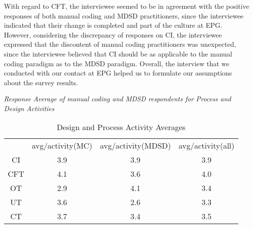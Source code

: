 \documentclass[final_report_innit.tex]{subfiles}
\newcommand\Tstrut{\rule{0pt}{2.6ex}}       %
\begin{document}
With regard to CFT, the interviewee seemed to be in agreement with the positive responses of both manual coding and MDSD practitioners, since the interviewee indicated that their change is completed and part of the culture at EPG. However, considering the discrepancy of responses on CI, the interviewee expressed that the discontent of manual coding practitioners was unexpected, since the interviewee believed that CI should be as applicable to the manual coding paradigm as to the MDSD paradigm. Overall, the interview that we conducted with our contact at EPG helped us to formulate our assumptions about the survey results. 
\\


\begin{center}\textit{Response Average of manual coding and MDSD respondents for Process and Design Activities}\end{center}

\begin{table}[h]
	\caption{Design and Process Activity Averages}
	\begin{center}
		\begin{tabular}{cccc}
		           & avg/activity(MC) & avg/activity(MDSD) & avg/activity(all) \Tstrut \\ 
			CI  & 3.9 & 3.9 & 3.9 \Tstrut \\  
			CFT & 4.1 & 3.6 & 4.0 \Tstrut \\ 
			OT  & 2.9 & 4.1 & 3.4 \Tstrut \\ 
			UT  & 3.6 & 2.6 & 3.3 \Tstrut \\ 
			CT  & 3.7 & 3.4 & 3.5 \Tstrut \\ 

		\end{tabular}
	\end{center}
\end{table}
\end{document}
